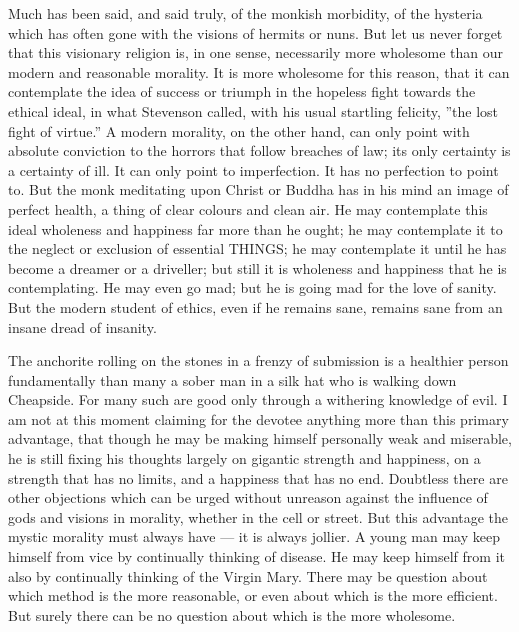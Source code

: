 
Much has been said, and said truly, of the monkish morbidity, of the hysteria which has often gone with the visions of hermits or nuns. But let us never forget that this visionary religion is, in one sense, necessarily more wholesome than our modern and reasonable morality. It is more wholesome for this reason, that it can contemplate the idea of success or triumph in the hopeless fight towards the ethical ideal, in what Stevenson called, with his usual startling felicity, ”the lost fight of virtue.” A modern morality, on the other hand, can only point with absolute conviction to the horrors that follow breaches of law; its only certainty is a certainty of ill. It can only point to imperfection. It has no perfection to point to. But the monk meditating upon Christ or Buddha has in his mind an image of perfect health, a thing of clear colours and clean air. He may contemplate this ideal wholeness and happiness far more than he ought; he may contemplate it to the neglect or exclusion of essential THINGS; he may contemplate it until he has become a dreamer or a driveller; but still it is wholeness and happiness that he is contemplating. He may even go mad; but he is going mad for the love of sanity. But the modern student of ethics, even if he remains sane, remains sane from an insane dread of insanity.

The anchorite rolling on the stones in a frenzy of submission is a healthier person fundamentally than many a sober man in a silk hat who is walking down Cheapside. For many such are good only through a withering knowledge of evil. I am not at this moment claiming for the devotee anything more than this primary advantage, that though he may be making himself personally weak and miserable, he is still fixing his thoughts largely on gigantic strength and happiness, on a strength that has no limits, and a happiness that has no end. Doubtless there are other objections which can be urged without unreason against the influence of gods and visions in morality, whether in the cell or street. But this advantage the mystic morality must always have — it is always jollier. A young man may keep himself from vice by continually thinking of disease. He may keep himself from it also by continually thinking of the Virgin Mary. There may be question about which method is the more reasonable, or even about which is the more efficient. But surely there can be no question about which is the more wholesome.

